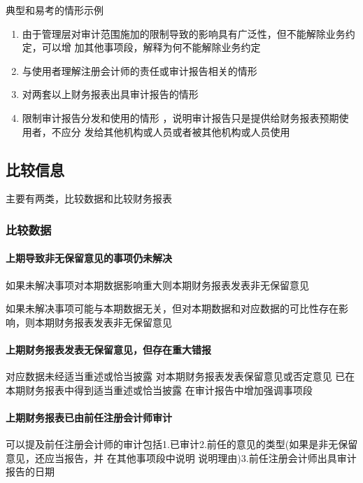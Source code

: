 \documentclass[UTF8,12pt]{ctexart}
\numberwithin{equation}{section} %
\numberwithin{figure}{section}
\numberwithin{table}{section}
\begin{document}
	典型和易考的情形示例 
	\begin{enumerate}
		\item 由于管理层对审计范围施加的限制导致的影响具有广泛性，但不能解除业务约定，可以增 加其他事项段，解释为何不能解除业务约定 
		
		\item 与使用者理解注册会计师的责任或审计报告相关的情形 
		
		\item 对两套以上财务报表出具审计报告的情形
		
		\item 限制审计报告分发和使用的情形  ，说明审计报告只是提供给财务报表预期使用者，不应分 发给其他机构或人员或者被其他机构或人员使用
	\end{enumerate}
	
	\subsection{比较信息}
	主要有两类，比较数据和比较财务报表
	
	\subsubsection{比较数据}
	
	\paragraph{上期导致非无保留意见的事项仍未解决 }
	如果未解决事项对本期数据影响重大则本期财务报表发表非无保留意见
	
	如果未解决事项可能与本期数据无关，但对本期数据和对应数据的可比性存在影响，则本期财务报表发表非无保留意见
	
	\paragraph{上期财务报表发表无保留意见，但存在重大错报 }
	对应数据未经适当重述或恰当披露    对本期财务报表发表保留意见或否定意见 已在本期财务报表中得到适当重述或恰当披露    在审计报告中增加强调事项段
	
	\paragraph{上期财务报表已由前任注册会计师审计}

	可以提及前任注册会计师的审计包括1.已审计2.前任的意见的类型(如果是非无保留意见，还应当报告，并  在其他事项段中说明 说明理由)3.前任注册会计师出具审计报告的日期
	
\end{document}
